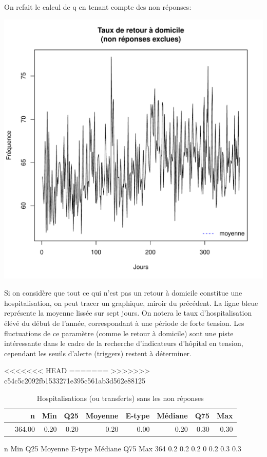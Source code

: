\documentclass[12pt,english,french,twoside]{book}\usepackage[]{graphicx}\usepackage[]{color}
\makeatletter
\def\maxwidth{ %
  \ifdim\Gin@nat@width>\linewidth
    \linewidth
  \else
    \Gin@nat@width
  \fi
}
\makeatother
\begin{document}
On refait le calcul de q en tenant compte des non réponses:

\includegraphics[width=\maxwidth]{figure/retour_dom2} 



Si on considère que tout ce qui n'est pas un retour à domicile constitue une hospitalisation, on peut tracer un graphique, miroir du précédent. La ligne bleue représente la moyenne lissée sur sept jours. On notera le taux d'hospitalisation élévé du début de l'année, correspondant à une période de forte tension. Les fluctuations de ce paramètre (comme le retour à domicile) sont une piste intéressante dans le cadre de la recherche d'indicateurs d'hôpital en tension, cependant les seuils d'alerte (triggers) restent à déterminer.

<<<<<<< HEAD
=======
>>>>>>> c54c5c2092fb1533271e395c561ab3d562e88125
\begin{table}[ht]
\centering
\begin{tabular}{rrrrrrrrr}
  \hline
 & n & Min & Q25 & Moyenne & E-type & Médiane & Q75 & Max \\ 
  \hline
 & 364.00 & 0.20 & 0.20 & 0.20 & 0.00 & 0.20 & 0.30 & 0.30 \\ 
   \hline
\end{tabular}
\caption[Hospitalisations]{Hospitalisations (ou transferts) sans les non réponses} 
\label{tab:hosp}
\end{table}
   n Min Q25 Moyenne E-type Médiane Q75 Max
 364 0.2 0.2     0.2      0     0.2 0.3 0.3
\end{document}
